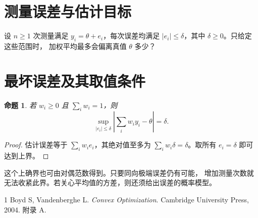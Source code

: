 \documentclass[UTF8,scheme=chinese,fontset=fandol,zihao=-4,a4paper]{ctexart}
\title{\PraxisTitle}
\author{}\date{}
\newcommand{\PraxisKeywords}[1]{\par\smallskip\noindent\textbf{关键词：}#1}
\theoremstyle{zhplain}
\newtheorem{proposition}[theorem]{命题}
\begin{document}
\maketitle
\begin{abstract}
多次测量均有相同的误差上界时，加权平均能把最坏误差降低多少？
对权重非负、总和为一的估计量，最坏误差恰好等于单次测量的误差上界。
所有测量同时出现同向极端误差时可达到这个界。
\PraxisKeywords{加权平均；误差界；测量}
\end{abstract}
\section{测量误差与估计目标}
设 $n\geq1$ 次测量满足 $y_i=\theta+e_i$，每次误差均满足
$|e_i|\leq\delta$，其中 $\delta\geq0$。只给定这些范围时，
加权平均最多会偏离真值 $\theta$ 多少？
\section{最坏误差及其取值条件}
\begin{proposition}
若 $w_i\geq0$ 且 $\sum_i w_i=1$，则
\[
  \sup_{|e_i|\leq\delta}\left|\sum_i w_i y_i-\theta\right|=\delta .
\]
\end{proposition}
\begin{proof}
估计误差等于 $\sum_i w_i e_i$，其绝对值至多为
$\sum_i w_i\delta=\delta$。取所有 $e_i=\delta$ 即可达到上界。
\end{proof}
这个上确界也可由对偶范数得到\cite{bv}。只要同向极端误差仍有可能，
增加测量次数就无法收紧此界。若关心平均值的方差，则还须给出误差的概率模型。
\begin{thebibliography}{1}
 Boyd S, Vandenberghe L. \textit{Convex Optimization}.
Cambridge University Press, 2004. 附录 A.
\end{thebibliography}
\end{document}

